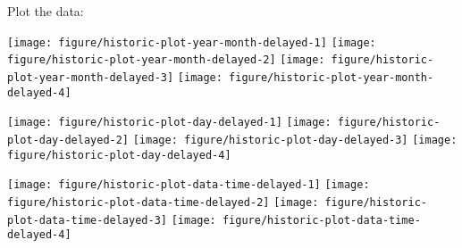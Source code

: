 \documentclass{article}\usepackage[]{graphicx}\usepackage[]{color}
\newenvironment{knitrout}{}{} %
\begin{document}
Plot the data:





\begin{knitrout}
\color{fgcolor}

{\centering \texttt{[image: figure/historic-plot-year-month-delayed-1]} 
\texttt{[image: figure/historic-plot-year-month-delayed-2]} 
\texttt{[image: figure/historic-plot-year-month-delayed-3]} 
\texttt{[image: figure/historic-plot-year-month-delayed-4]} 

}



\end{knitrout}

\begin{knitrout}
\color{fgcolor}

{\centering \texttt{[image: figure/historic-plot-day-delayed-1]} 
\texttt{[image: figure/historic-plot-day-delayed-2]} 
\texttt{[image: figure/historic-plot-day-delayed-3]} 
\texttt{[image: figure/historic-plot-day-delayed-4]} 

}



\end{knitrout}


\begin{knitrout}
\color{fgcolor}

{\centering \texttt{[image: figure/historic-plot-data-time-delayed-1]} 
\texttt{[image: figure/historic-plot-data-time-delayed-2]} 
\texttt{[image: figure/historic-plot-data-time-delayed-3]} 
\texttt{[image: figure/historic-plot-data-time-delayed-4]} 

}



\end{knitrout}
\end{document}
